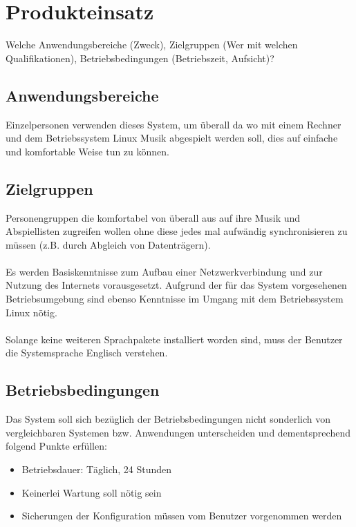 \chapter{Produkteinsatz}
Welche Anwendungsbereiche (Zweck), Zielgruppen (Wer mit welchen Qualifikationen), Betriebsbedingungen (Betriebszeit,
Aufsicht)?
\section{Anwendungsbereiche}
Einzelpersonen verwenden dieses System, um überall da wo mit einem Rechner und dem Betriebssystem Linux Musik abgespielt werden soll, dies auf einfache und komfortable Weise tun zu können.
\section{Zielgruppen}
Personengruppen die komfortabel von überall aus auf ihre Musik und Abspiellisten zugreifen wollen ohne diese jedes mal aufwändig synchronisieren zu müssen (z.B. durch Abgleich von Datenträgern).\ \\ \\
Es werden Basiskenntnisse zum Aufbau einer Netzwerkverbindung und zur Nutzung des Internets vorausgesetzt. Aufgrund der für das System vorgesehenen Betriebsumgebung sind ebenso Kenntnisse im Umgang mit dem Betriebssystem Linux nötig.\ \\ \\
Solange keine weiteren Sprachpakete installiert worden sind, muss der Benutzer die Systemsprache Englisch verstehen.
\section{Betriebsbedingungen}
Das System soll sich bezüglich der Betriebsbedingungen nicht sonderlich von vergleichbaren Systemen bzw. Anwendungen unterscheiden und dementsprechend folgend Punkte erfüllen:
\begin{itemize}
		\item Betriebsdauer: Täglich, 24 Stunden
		\item Keinerlei Wartung soll nötig sein
		\item Sicherungen der Konfiguration müssen vom Benutzer vorgenommen werden
\end{itemize}